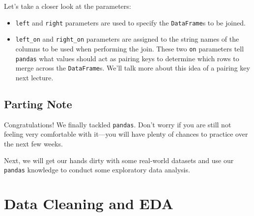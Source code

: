 \documentclass[
  letterpaper,
  DIV=11,
  numbers=noendperiod]{scrreprt}
\providecommand{\tightlist}{%
  \setlength{\itemsep}{0pt}\setlength{\parskip}{0pt}}\usepackage{longtable,booktabs,array}
\begin{document}
Let's take a closer look at the parameters:

\begin{itemize}
\tightlist
\item
  \texttt{left} and \texttt{right} parameters are used to specify the
  \texttt{DataFrame}s to be joined.
\item
  \texttt{left\_on} and \texttt{right\_on} parameters are assigned to
  the string names of the columns to be used when performing the join.
  These two \texttt{on} parameters tell \texttt{pandas} what values
  should act as pairing keys to determine which rows to merge across the
  \texttt{DataFrame}s. We'll talk more about this idea of a pairing key
  next lecture.
\end{itemize}

\hypertarget{parting-note-2}{%
\section{Parting Note}\label{parting-note-2}}

Congratulations! We finally tackled \texttt{pandas}. Don't worry if you
are still not feeling very comfortable with it---you will have plenty of
chances to practice over the next few weeks.

Next, we will get our hands dirty with some real-world datasets and use
our \texttt{pandas} knowledge to conduct some exploratory data analysis.


\hypertarget{data-cleaning-and-eda}{%
\chapter{Data Cleaning and EDA}\label{data-cleaning-and-eda}}
\end{document}

